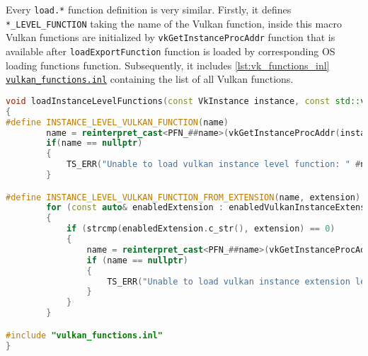 Every \texttt{load.*} function definition is very similar. Firstly, it defines \texttt{*\_LEVEL\_FUNCTION} taking the name of the Vulkan function, inside this macro Vulkan functions are initialized by \texttt{vkGetInstanceProcAddr} function that is available after \texttt{loadExportFunction} function is loaded by corresponding OS loading functions function. Subsequently, it includes \hyperref[lst:vk_functions_inl]{\ref*{lst:vk_functions_inl} \texttt{vulkan\_functions.inl}} containing the list of all Vulkan functions.
\begin{lstlisting}[language=c++, caption=Loading Vulkan functions (./engine/src/vulkan\_tools/vulkan\_loader.cpp)]
void loadInstanceLevelFunctions(const VkInstance instance, const std::vector<std::string>& enabledVulkanInstanceExtensions)
{
#define INSTANCE_LEVEL_VULKAN_FUNCTION(name)                                                 \
        name = reinterpret_cast<PFN_##name>(vkGetInstanceProcAddr(instance, #name));         \
        if(name == nullptr)                                                                  \
        {                                                                                    \
            TS_ERR("Unable to load vulkan instance level function: " #name);                 \
        }

#define INSTANCE_LEVEL_VULKAN_FUNCTION_FROM_EXTENSION(name, extension)                       \
        for (const auto& enabledExtension : enabledVulkanInstanceExtensions)                 \
        {                                                                                    \
            if (strcmp(enabledExtension.c_str(), extension) == 0)                            \
            {                                                                                \
                name = reinterpret_cast<PFN_##name>(vkGetInstanceProcAddr(instance, #name)); \
                if (name == nullptr)                                                         \
                {                                                                            \
                    TS_ERR("Unable to load vulkan instance extension level function: " #extension); \
                }                                                                            \
            }                                                                                \
        }

#include "vulkan_functions.inl"
}
\end{lstlisting}

